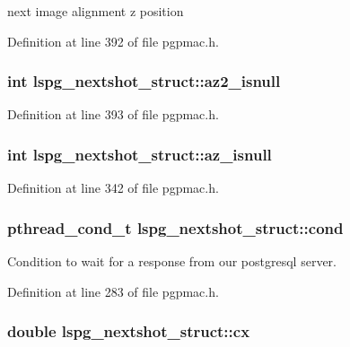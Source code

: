 next image alignment z position 



Definition at line 392 of file pgpmac.\-h.

\hypertarget{structlspg__nextshot__struct_a95d080f13a4e02b9aa883821ee3e721c}{
\subsubsection[{az2\-\_\-isnull}]{\setlength{\rightskip}{0pt plus 5cm}int lspg\-\_\-nextshot\-\_\-struct\-::az2\-\_\-isnull}}\label{structlspg__nextshot__struct_a95d080f13a4e02b9aa883821ee3e721c}


Definition at line 393 of file pgpmac.\-h.

\hypertarget{structlspg__nextshot__struct_aaebd6d432810313294b5fed5f4445cb1}{
\subsubsection[{az\-\_\-isnull}]{\setlength{\rightskip}{0pt plus 5cm}int lspg\-\_\-nextshot\-\_\-struct\-::az\-\_\-isnull}}\label{structlspg__nextshot__struct_aaebd6d432810313294b5fed5f4445cb1}


Definition at line 342 of file pgpmac.\-h.

\hypertarget{structlspg__nextshot__struct_afc773a9eefc173aa98d5c2889e1d7669}{
\subsubsection[{cond}]{\setlength{\rightskip}{0pt plus 5cm}pthread\-\_\-cond\-\_\-t lspg\-\_\-nextshot\-\_\-struct\-::cond}}\label{structlspg__nextshot__struct_afc773a9eefc173aa98d5c2889e1d7669}


Condition to wait for a response from our postgresql server. 



Definition at line 283 of file pgpmac.\-h.

\hypertarget{structlspg__nextshot__struct_ad9eb2013fa6f295f72f0891fe98c863f}{
\subsubsection[{cx}]{\setlength{\rightskip}{0pt plus 5cm}double lspg\-\_\-nextshot\-\_\-struct\-::cx}}\label{structlspg__nextshot__struct_ad9eb2013fa6f295f72f0891fe98c863f}


